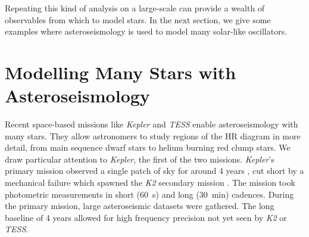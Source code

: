 


Repeating this kind of analysis on a large-scale can provide a wealth of observables from which to model stars. In the next section, we give some examples where asteroseismology is used to model many solar-like oscillators.

\section[Modelling Stars with Asteroseismology]{Modelling Many Stars with Asteroseismology}\label{sec:many-stars}

Recent space-based missions like \emph{Kepler} and \emph{TESS} enable asteroseismology with many stars. They allow astronomers to study regions of the HR diagram in more detail, from main sequence dwarf stars to helium burning red clump stars. We draw particular attention to \emph{Kepler}, the first of the two missions. \emph{Kepler}'s primary mission observed a single patch of sky for around 4 years \citep{Borucki.Koch.ea2010}, cut short by a mechanical failure which spawned the \emph{K2} secondary mission \citep{Howell.Sobeck.ea2014}. The mission took photometric measurements in short (\SI{60}{\second}) and long (\SI{30}{\minute}) cadences. During the primary mission, large asteroseismic datasets were gathered. The long baseline of 4 years allowed for high frequency precision not yet seen by \emph{K2} or \emph{TESS}.

